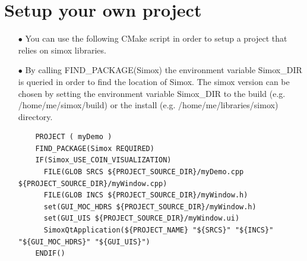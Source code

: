 \documentclass{book}
\begin{document}
\section{Setup your own project}
\begin{itemize}
\item[$\bullet$] You can use the following CMake script in order to setup a project that relies on simox libraries. 
\item[$\bullet$] By calling FIND\_PACKAGE(Simox) the environment variable Simox\_DIR is queried in order to find the location of Simox. The simox version can be chosen by setting the environment variable Simox\_DIR to the build (e.g. /home/me/simox/build) or the install (e.g. /home/me/libraries/simox) directory. 
\begin{lstlisting}
    PROJECT ( myDemo )
    FIND_PACKAGE(Simox REQUIRED)
    IF(Simox_USE_COIN_VISUALIZATION)
      FILE(GLOB SRCS ${PROJECT_SOURCE_DIR}/myDemo.cpp ${PROJECT_SOURCE_DIR}/myWindow.cpp)
      FILE(GLOB INCS ${PROJECT_SOURCE_DIR}/myWindow.h)
      set(GUI_MOC_HDRS ${PROJECT_SOURCE_DIR}/myWindow.h)
      set(GUI_UIS ${PROJECT_SOURCE_DIR}/myWindow.ui)
      SimoxQtApplication(${PROJECT_NAME} "${SRCS}" "${INCS}" "${GUI_MOC_HDRS}" "${GUI_UIS}")
    ENDIF()
\end{lstlisting}
\end{itemize}
    
\end{document}
